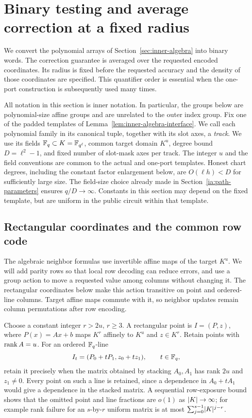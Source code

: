 \section{Binary testing and average correction at a fixed radius}
\label{sec:inner-binary}

We convert the polynomial arrays of Section~\ref{sec:inner-algebra} into
binary words.  The correction guarantee is averaged over the requested
encoded coordinates.  Its radius is fixed before the requested accuracy
and the density of those coordinates are specified.  This quantifier
order is essential when the one-port construction is subsequently used
many times.

All notation in this section is inner notation.  In particular, the
groups below are polynomial-size affine groups and are unrelated to the
outer index group.  Fix one of the padded templates of
Lemma~\ref{lem:inner-algebra-interface}.  We call each polynomial family
in its canonical tuple, together with its slot axes, a \emph{track}.
We use its fields
\(\mathbb{F}_q\subset K=\mathbb{F}_{q^\ell}\), common target domain \(K^u\), degree
bound \(D=\ell^2-1\), and fixed number of slot-mask axes per track.
The integer \(u\) and the field conventions are common to the actual
and one-port templates.  Honest chart degrees, including the constant
factor enlargement below, are \(O(\ell h)<D\) for sufficiently large
size.  The field-size choice already made in
Section~\ref{ia:path-parameters} ensures \(q/D\longrightarrow\infty\).
Constants in this section may depend on the fixed template, but are uniform
in the public circuit within that template.

\subsection{Rectangular coordinates and the common row code}
\label{ib:rectangular-code}

The algebraic neighbor formulas use invertible affine maps of the target
\(K^u\). We will add parity rows so that local row decoding can reduce
errors, and use a group action to move a requested value among columns
without changing it. The rectangular coordinates below make this action
transitive on point and ordered-line columns. Target affine maps commute
with it, so neighbor updates remain column permutations after row encoding.

Choose a constant integer \(r>2u\), \(r\ge3\).  A rectangular point
is \(I=(P,z)\), where \(P(x)=Ax+b\) maps \(K^r\) affinely to
\(K^u\) and \(z\in K^r\).  Retain points with \(\operatorname{rank} A=u\).
For an ordered \(\mathbb{F}_q\)-line
\[
 I_t=(P_0+tP_1,z_0+tz_1),\qquad t\in\mathbb{F}_q,
\]
retain it precisely when the matrix obtained by stacking \(A_0,A_1\)
has rank \(2u\) and \(z_1\ne0\).  Every point on such a line is
retained, since a dependence in \(A_0+tA_1\) would give a dependence
in the stacked matrix.  A sequential row-exposure bound shows that
the omitted point and line fractions are \(o(1)\) as \(\lvert K\rvert\to
\infty\); for example rank failure for an \(s\)-by-\(r\) uniform
matrix is at most \(\sum_{j=0}^{s-1}\lvert K\rvert^{j-r}\).

